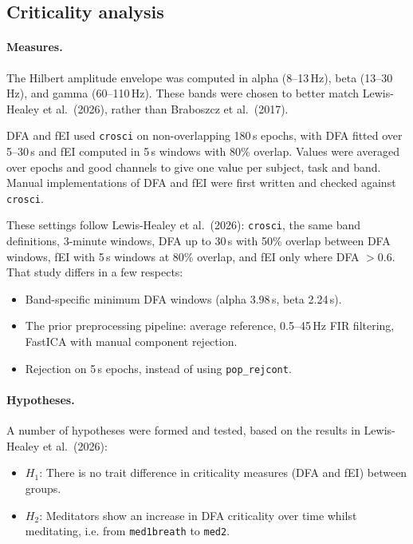 \documentclass[10pt,a4paper]{article}
\begin{document}
\subsection{Criticality analysis}
\label{sec:critmethod}

\paragraph{Measures.} The Hilbert amplitude envelope was computed in alpha (8--13\,Hz),
beta (13--30\,Hz), and gamma (60--110\,Hz). These bands were chosen to better match Lewis-Healey et al.\ (2026), 
rather than Braboszcz et al.\ (2017).

DFA and fEI used \texttt{crosci} on
non-overlapping 180\,s epochs, with DFA fitted over 5--30\,s and fEI computed in 5\,s windows with 80\%
overlap. Values were averaged over epochs and good channels to give one value per subject, task and band.
Manual implementations of DFA and fEI were first written and checked against \texttt{crosci}.

These settings follow Lewis-Healey et al.\ (2026): \texttt{crosci}, the same band definitions, 3-minute windows, DFA up to
30\,s with 50\% overlap between DFA windows, fEI with 5\,s windows at 80\% overlap, and fEI only where DFA $>0.6$. That study differs in a few respects:
\begin{itemize}
  \item Band-specific minimum DFA windows (alpha 3.98\,s, beta 2.24\,s).
  \item The prior preprocessing pipeline: average reference, 0.5--45\,Hz FIR filtering, FastICA with manual component rejection.
  \item Rejection on 5\,s epochs, instead of using \texttt{pop\_rejcont}.
\end{itemize}

\paragraph{Hypotheses.} 

A number of hypotheses were formed and tested, based on the results in Lewis-Healey et al.\ (2026):

\begin{itemize}
  \item \textbf{$H_1$}: There is no trait difference in criticality measures (DFA and fEI) between groups.
  \item \textbf{$H_2$}: Meditators show an increase in DFA criticality over time whilst meditating, i.e. 
      from \texttt{med1breath} to \texttt{med2}.
\end{itemize}
\end{document}
